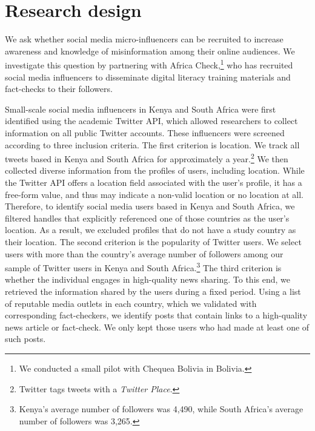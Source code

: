 \section{Research design}

We ask whether social media micro-influencers can be recruited to increase awareness and knowledge of misinformation among their online audiences. We investigate this question by partnering with Africa Check,\footnote{We conducted a small pilot with Chequea Bolivia in Bolivia.} who has recruited social media influencers to disseminate digital literacy training materials and fact-checks to their followers.

Small-scale social media influencers in Kenya and South Africa were first identified using the academic Twitter API, which allowed  researchers to collect information on all public Twitter accounts. These influencers were screened according to three inclusion criteria. The first criterion is location. We track all tweets based in Kenya and South Africa for approximately a year.\footnote{Twitter tags tweets with a \textit{Twitter Place}.} We then collected diverse information from the profiles of users, including location. While the Twitter API offers a location field associated with the user's profile, it has a free-form value, and thus may indicate a non-valid location or no location at all. Therefore, to identify social media users based in Kenya and South Africa, we filtered handles that explicitly referenced one of those countries as the user's location. As a result, we excluded profiles that do not have a study country as their location. The second criterion is the popularity of Twitter users. We select users with more than the country's average number of followers among our sample of Twitter users in Kenya and South Africa.\footnote{Kenya's average number of followers was 4,490, while South Africa's average number of followers was 3,265.}  The third criterion is whether the individual engages in high-quality news sharing. To this end, we retrieved the information shared by the users during a fixed period. Using a list of reputable media outlets in each country, which we validated with corresponding fact-checkers, we identify posts that contain links to a high-quality news article or fact-check. We only kept those users who had made at least one of such posts. 

